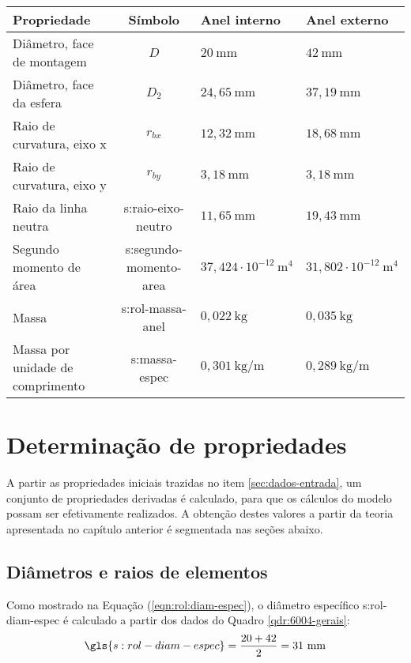 \documentclass[12pt,oneside,english,brazil,lmodern,siglas,simbolos,cite=num]{ucsmonograph}
\begin{document}
	\begin{quadro}[h]
	\def\arraystretch{1.2}
	\caption{Dados dos anéis do rolamento 6004-2RSH}
	\begin{tabular}{l|c|l|l}
	\hline
	\textbf{Propriedade} & \textbf{Símbolo} & \textbf{Anel interno} & \textbf{Anel externo} \\\hline\hline
	Diâmetro, face de montagem & $D$ & $20\ \text{mm}$ & $ 42\ \text{mm}$ \\\hline
	Diâmetro, face da esfera & $D_2$ & $24,65\ \text{mm}$ & $37,19\ \text{mm}$ \\\hline
	Raio de curvatura, eixo x & $r_{bx}$ & $12,32\ \text{mm}$ & $18,68\ \text{mm}$ \\\hline
	Raio de curvatura, eixo y & $r_{by}$ & $3,18\ \text{mm}$ & $3,18\ \text{mm}$ \\\hline
	Raio da linha neutra & \gls{s:raio-eixo-neutro} & $11,65\ \text{mm}$ & $19,43\ \text{mm}$ \\\hline
	Segundo momento de área & \gls{s:segundo-momento-area} & $37,424\cdot 10^{-12}\ \text{m}^4$ & $31,802\cdot 10^{-12}\ \text{m}^4$ \\\hline
	Massa & \gls{s:rol-massa-anel} & $0,022\ \text{kg}$ & $0,035\ \text{kg}$ \\\hline
	Massa por unidade de comprimento & \gls{s:massa-espec} & $0,301\ \text{kg/m}$ & $0,289\ \text{kg/m}$ \\\hline
	\end{tabular}
	\label{qdr:6004-aneis}
	\end{quadro}

	\begin{figure}[t]
		\label{fig:3d-rolamento}
	\end{figure}

	\section{Determinação de propriedades}
	A partir as propriedades iniciais trazidas no item \ref{sec:dados-entrada}, um conjunto de propriedades derivadas é calculado, para que os cálculos do modelo possam ser efetivamente realizados.
	A obtenção destes valores a partir da teoria apresentada no capítulo anterior é segmentada nas seções abaixo.

	\subsection{Diâmetros e raios de elementos}	
	Como mostrado na Equação (\ref{eqn:rol:diam-espec}), o diâmetro específico \gls{s:rol-diam-espec} é calculado a partir dos dados do Quadro \ref{qdr:6004-gerais}:
	\begin{equation*}
		\gls{s:rol-diam-espec} = \frac{20 + 42}{2} = 31\ \text{mm}
	\end{equation*}
	
\end{document}
